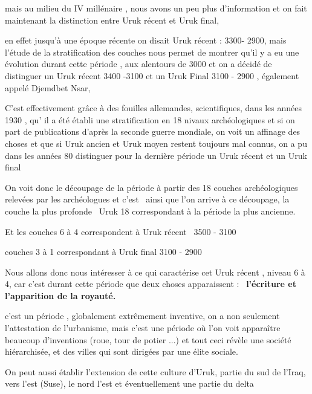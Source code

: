 \documentclass[a4paper]{article}
\begin{document}
{
mais au milieu du IV millénaire , nous avons un peu plus d'information
et on fait maintenant la distinction entre Uruk récent et Uruk final,}

{
en effet jusqu'à une époque récente on disait Uruk récent : 3300- 2900,
mais l'étude de la stratification des couches nous permet de montrer
qu'il y a eu une évolution durant cette période , aux alentours de 3000
et on a décidé de distinguer un Uruk récent 3400 -3100 et un Uruk Final
3100 - 2900 , également appelé Djemdbet Nsar, }

{
C'est effectivement grâce à des fouilles allemandes, scientifiques, dans
les années 1930 , qu' il a été établi une stratification en 18 nivaux
archéologiques et si on part de publications d'après la seconde guerre
mondiale, on voit un affinage des choses et que si Uruk ancien et Uruk
moyen restent toujours mal connus, on a pu dans les années 80
distinguer pour la dernière période un Uruk récent et un Uruk final}

{
On voit donc le découpage de la période à partir des 18 couches
archéologiques relevées par les archéologues et c'est \ ainsi que l'on
arrive à ce découpage, la couche la plus profonde \ Uruk 18
correspondant à la période la plus ancienne.}


\bigskip

{
Et les couches 6 à 4 correspondent à Uruk récent \ 3500 - 3100}

{
couches 3 à 1 correspondant à Uruk final 3100 - 2900 }


\bigskip


\bigskip

{
Nous allons donc nous intéresser à ce qui caractérise cet Uruk récent ,
niveau 6 à 4, car c'est durant cette période que deux choses
apparaissent : \ \textbf{l'écriture et l'apparition de la royauté.}}


\bigskip

{
c'est un période , globalement extrêmement inventive, on a non seulement
l'attestation de l'urbanisme, mais c'est une période où l'on voit
apparaître beaucoup d'inventions (roue, tour de potier ...) et tout
ceci révèle une société hiérarchisée, et des villes qui sont dirigées
par une élite sociale.}


\bigskip

{
On peut aussi établir l'extension de cette culture d'Uruk, partie du sud
de l'Iraq, vers l'est (Suse), le nord l'est et éventuellement une
partie du delta}
\end{document}
